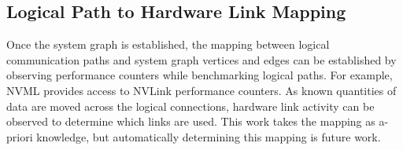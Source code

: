 \subsection{Logical Path to Hardware Link Mapping}

Once the system graph is established, the mapping between logical communication paths and system graph vertices and edges can be established by observing performance counters while benchmarking logical paths.
For example, NVML provides access to NVLink performance counters.
As known quantities of data are moved across the logical connections, hardware link activity can be observed to determine which links are used.
This work takes the mapping as a-priori knowledge, but automatically determining this mapping is future work.